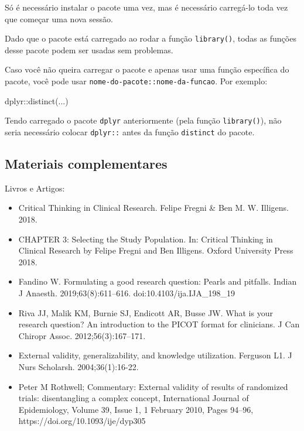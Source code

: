 \documentclass[
  letterpaper,
  DIV=11,
  numbers=noendperiod]{scrreprt}
\newenvironment{Shaded}{\begin{snugshade}}{\end{snugshade}}
\newcommand{\FunctionTok}[1]{\textcolor[rgb]{0.28,0.35,0.67}{#1}}
\newcommand{\NormalTok}[1]{\textcolor[rgb]{0.00,0.23,0.31}{#1}}
\newcommand{\SpecialCharTok}[1]{\textcolor[rgb]{0.37,0.37,0.37}{#1}}
\begin{document}
Só é necessário instalar o pacote uma vez, mas é necessário carregá-lo
toda vez que começar uma nova sessão.

Dado que o pacote está carregado ao rodar a função \texttt{library()},
todas as funções desse pacote podem ser usadas sem problemas.

Caso você não queira carregar o pacote e apenas usar uma função
específica do pacote, você pode usar
\texttt{nome-do-pacote::nome-da-funcao}. Por exemplo:

\begin{Shaded}
\begin{Highlighting}[]
\NormalTok{dplyr}\SpecialCharTok{::}\FunctionTok{distinct}\NormalTok{(...)}
\end{Highlighting}
\end{Shaded}

Tendo carregado o pacote \texttt{dplyr} anteriormente (pela função
\texttt{library()}), não seria necessário colocar \texttt{dplyr::} antes
da função \texttt{distinct} do pacote.

\hypertarget{materiais-complementares-1}{%
\subsection{Materiais complementares}\label{materiais-complementares-1}}

Livros e Artigos:

\begin{itemize}
\item
  Critical Thinking in Clinical Research. Felipe Fregni \& Ben M. W.
  Illigens. 2018.
\item
  CHAPTER 3: Selecting the Study Population. In: Critical Thinking in
  Clinical Research by Felipe Fregni and Ben Illigens. Oxford University
  Press 2018.
\item
  Fandino W. Formulating a good research question: Pearls and pitfalls.
  Indian J Anaesth. 2019;63(8):611--616. doi:10.4103/ija.IJA\_198\_19
\item
  Riva JJ, Malik KM, Burnie SJ, Endicott AR, Busse JW. What is your
  research question? An introduction to the PICOT format for clinicians.
  J Can Chiropr Assoc. 2012;56(3):167--171.
\item
  External validity, generalizability, and knowledge utilization.
  Ferguson L1. J Nurs Scholarsh. 2004;36(1):16-22.
\item
  Peter M Rothwell; Commentary: External validity of results of
  randomized trials: disentangling a complex concept, International
  Journal of Epidemiology, Volume 39, Issue 1, 1 February 2010, Pages
  94--96, https://doi.org/10.1093/ije/dyp305
\end{itemize}
\end{document}
